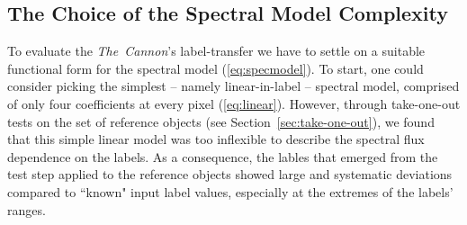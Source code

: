 \documentclass[12pt, preprint]{aastex}
\newcommand{\sectionname}{Section}
\newcommand{\teff}{\mbox{$\rm T_{eff}$}}
\newcommand{\feh}{\mbox{$\rm [Fe/H]$}}
\newcommand{\logg}{\mbox{$\rm \log g$}}
\newcommand{\tc}{\textsl{The~Cannon}}
\newcommand{\apogee}{\textsl{APOGEE}}
\newcommand{\aspcap}{\textsl{ASPCAP}}
\begin{document}

\subsection{The Choice of the Spectral Model Complexity}
\label{sec:ModelComplexity} 

To evaluate the \tc 's label-transfer we have to settle on a suitable functional form for the spectral model (\ref{eq:specmodel}).
To start, one could consider picking the simplest -- namely linear-in-label -- spectral model, comprised of only four coefficients at every pixel (\ref{eq:linear}).
However, through take-one-out tests on the set of reference objects (see \sectionname~\ref{sec:take-one-out}), we found that this simple linear model was too inflexible to describe the spectral flux dependence on the labels.
As a consequence, the lables that emerged from the test step applied to the reference objects showed large and systematic deviations compared to ``known" input label values,
especially at the extremes of the labels' ranges. 
\end{document}
